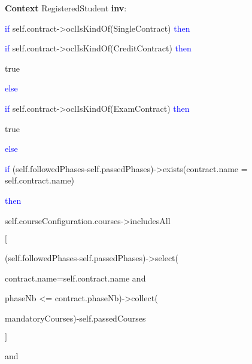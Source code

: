 \begin{enumerate}
	\npar \textbf{Context} RegisteredStudent \textbf{inv}:
	\par \hspace*{5 mm} \textcolor{Blue}{if}
	self.contract->oclIsKindOf(SingleContract) \textcolor{Blue}{then}
	\par \hspace*{10 mm} \textcolor{Blue}{if}
	self.contract->oclIsKindOf(CreditContract) \textcolor{Blue}{then} 
	\par \hspace*{15 mm} true
	\par \hspace*{10 mm} \textcolor{Blue}{else}
	\par \hspace*{15 mm} \textcolor{Blue}{if}
	self.contract->oclIsKindOf(ExamContract) \textcolor{Blue}{then} 
	\par \hspace*{20 mm} true
	\par \hspace*{15 mm} \textcolor{Blue}{else}
	\par \hspace*{20 mm} \textcolor{Blue}{if}
	(self.followedPhases-self.passedPhases)->exists(contract.name
	= self.contract.name)
	\par \hspace*{20 mm} \textcolor{Blue}{then}
	 \par \hspace*{25 mm} self.courseConfiguration.courses->includesAll
	 \par \hspace*{25 mm} $[$
	 \par \hspace*{27 mm} (self.followedPhases-self.passedPhases)->select(
	 \par \hspace*{27 mm} contract.name=self.contract.name and 
	 \par \hspace*{27 mm} phaseNb <= contract.phaseNb)->collect(
	 \par \hspace*{27 mm}  mandatoryCourses)-self.passedCourses
	 \par \hspace*{25 mm} $]$
	 \par \hspace*{25 mm} and
	  
	
\end{enumerate}

